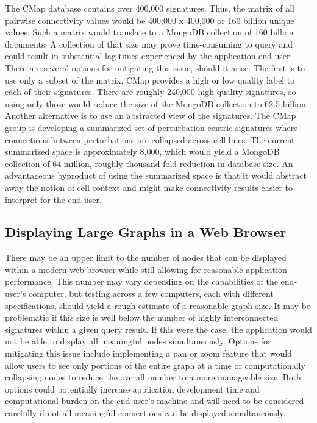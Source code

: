 \documentclass[12pt]{article}
\begin{document}
The CMap database contains over 400,000 signatures. Thus, the matrix of all pairwise connectivity values would be 400,000 x 400,000 or 160 billion unique values. Such a matrix would translate to a MongoDB collection of 160 billion documents. A collection of that size may prove time-consuming to query and could result in substantial lag times experienced by the application end-user. There are several options for mitigating this issue, should it arise. The first is to use only a subset of the matrix. CMap provides a high or low quality label to each of their signatures. There are roughly 240,000 high quality signatures, so using only those would reduce the size of the MongoDB collection to 62.5 billion. Another alternative is to use an abstracted view of the signatures. The CMap group is developing a summarized set of perturbation-centric signatures where connections between perturbations are collapsed across cell lines. The current summarized space is approximately 8,000, which would yield a MongoDB collection of 64 million, roughly thousand-fold reduction in database size. An advantageous byproduct of using the summarized space is that it would abstract away the notion of cell context and might make connectivity results easier to interpret for the end-user.

\subsection{Displaying Large Graphs in a Web Browser}

There may be an upper limit to the number of nodes that can be displayed within a modern web browser while still allowing for reasonable application performance. This number may vary depending on the capabilities of the end-user's computer, but testing across a few computers, each with different specifications, should yield a rough estimate of a reasonable graph size. It may be problematic if this size is well below the number of highly interconnected signatures within a given query result. If this were the case, the application would not be able to display all meaningful nodes simultaneously. Options for mitigating this issue include implementing a pan or zoom feature that would allow users to see only portions of the entire graph at a time or computationally collapsing nodes to reduce the overall number to a more manageable size. Both options could potentially increase application development time and computational burden on the end-user's machine and will need to be considered carefully if not all meaningful connections can be displayed simultaneously.
\end{document}
